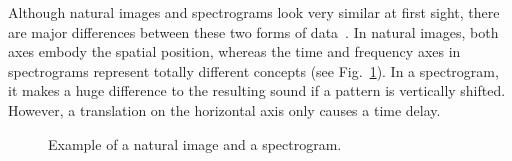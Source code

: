 Although natural images and spectrograms look very similar at first sight, there are major differences between these two forms of data~\cite{peeters2021deep}. In natural images, both axes embody the spatial position, whereas the time and frequency axes in spectrograms represent totally different concepts (see Fig.~\ref{fig:cat-vs-spectrogram}). In a spectrogram, it makes a huge difference to the resulting sound if a pattern is vertically shifted. However, a translation on the horizontal axis only causes a time delay.
\begin{figure}
	\centering
	\caption{Example of a natural image and a spectrogram.}\label{fig:cat-vs-spectrogram}
\end{figure}